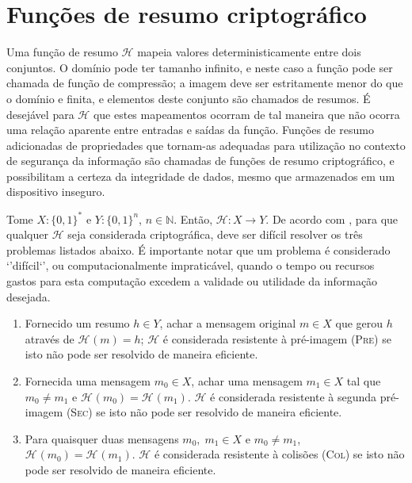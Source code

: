 \documentclass{article}
\newcommand{\hh}{$\mathcal{H}$}
\newcommand{\hash}[2][]{\mathcal{H}^{#1}(#2)}
\newcommand{\binwds}[1]{\{0, 1\}^{#1}}
\begin{document}
\section{Funções de resumo criptográfico}

Uma função de resumo \hh{} mapeia valores deterministicamente entre dois
conjuntos. O domínio pode ter tamanho infinito, e neste caso a função pode ser
chamada de função de compressão; a imagem deve ser estritamente menor do que o
domínio e finita, e elementos deste conjunto são chamados de resumos. É
desejável para \hh{} que estes mapeamentos ocorram de tal maneira que não
ocorra uma relação aparente entre entradas e saídas da função. Funções de
resumo adicionadas de propriedades que tornam-as adequadas para utilização no
contexto de segurança da informação são chamadas de funções de resumo
criptográfico, e possibilitam a certeza da integridade de dados, mesmo que
armazenados em um dispositivo inseguro.

Tome $X : \binwds{*}$ e $Y : \binwds{n}$, $n \in \mathbb{N}$. Então,
$\mathcal{H} : X \longrightarrow Y$. De acordo com
\cite{stinson2005cryptography}, para que qualquer \hh{} seja considerada
criptográfica, deve ser difícil resolver os três problemas listados abaixo.
É importante notar que um problema é considerado `'difícil`', ou
computacionalmente impraticável, quando o tempo ou recursos gastos para esta
computação excedem a validade ou utilidade da informação desejada.

\begin{enumerate}[label=\roman*.]

  \item Fornecido um resumo $h \in Y$, achar a mensagem original $m \in X$ que
    gerou $h$ através de $\hash{m} = h$; \hh{} é considerada resistente à
    pré-imagem (\textsc{Pre}) se isto não pode ser resolvido de maneira
    eficiente.

  \item Fornecida uma mensagem $m_0 \in X$, achar uma mensagem $m_1 \in X$ tal
    que $m_0 \neq m_1$ e $\hash{m_0} = \hash{m_1}$. \hh{} é considerada
    resistente à segunda pré-imagem (\textsc{Sec}) se isto não pode ser
    resolvido de maneira eficiente.

  \item Para quaisquer duas mensagens $m_0, \; m_1 \in X$ e $m_0 \neq m_1$,
    $\hash{m_0} = \hash{m_1}$. \hh{} é considerada resistente à colisões
    (\textsc{Col}) se isto não pode ser resolvido de maneira eficiente.

\end{enumerate}
\end{document}
